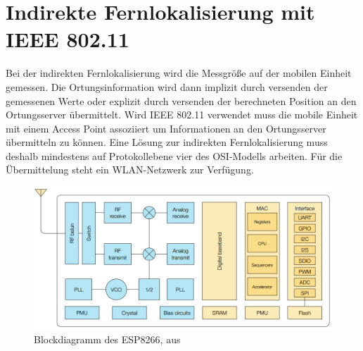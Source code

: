 \chapter{Indirekte Fernlokalisierung mit IEEE 802.11}
\label{ch:phase1}
Bei der indirekten Fernlokalisierung wird die Messgröße auf der mobilen Einheit gemessen.
Die Ortungsinformation wird dann implizit durch versenden der gemessenen Werte oder explizit durch versenden der berechneten Position an den Ortungsserver übermittelt.
Wird IEEE 802.11 verwendet muss die mobile Einheit mit einem Access Point assoziiert um Informationen an den Ortungsserver übermitteln zu können.
Eine Lösung zur indirekten Fernlokalisierung muss deshalb mindestens auf Protokollebene vier des OSI-Modells arbeiten.
Für die Übermittelung steht ein WLAN-Netzwerk zur Verfügung.

\begin{figure}[h]
  \centering
	\includegraphics[width=\textwidth]{images/espblock.png}
  \caption{Blockdiagramm des ESP8266, aus \cite{espressif2017esp8266}}
  \label{fig:espblock}
\end{figure}

